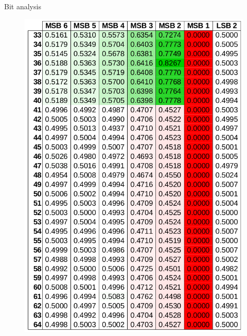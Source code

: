 \documentclass{beamer}
\begin{document}
\begin{darkframes}
\begin{frame}{Bit analysis}
\begin{figure}[H]
\begin{minipage}{.5\textwidth}
          \includegraphics[width=0.96\linewidth]{../tex/images/analysis/presentation_bit_2}
        \end{minipage}
      \end{figure}         
    \end{frame}


\end{darkframes}
\end{document}
